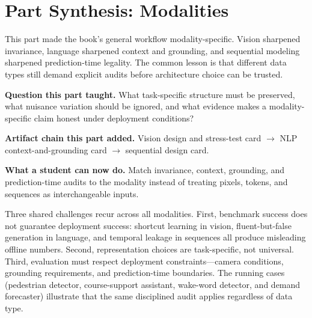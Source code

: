 \chapter*{Part Synthesis: Modalities}

\begin{whychaptermatters}
This part made the book's general workflow modality-specific. Vision sharpened invariance, language sharpened context and grounding, and sequential modeling sharpened prediction-time legality. The common lesson is that different data types still demand explicit audits before architecture choice can be trusted.
\end{whychaptermatters}

\begin{chaptersummary}
\item \textbf{Question this part taught.} What task-specific structure must be preserved, what nuisance variation should be ignored, and what evidence makes a modality-specific claim honest under deployment conditions?
\item \textbf{Artifact chain this part added.} Vision design and stress-test card $\rightarrow$ NLP context-and-grounding card $\rightarrow$ sequential design card.
\item \textbf{What a student can now do.} Match invariance, context, grounding, and prediction-time audits to the modality instead of treating pixels, tokens, and sequences as interchangeable inputs.
\end{chaptersummary}

Three shared challenges recur across all modalities. First, benchmark success does not guarantee deployment success: shortcut learning in vision, fluent-but-false generation in language, and temporal leakage in sequences all produce misleading offline numbers. Second, representation choices are task-specific, not universal. Third, evaluation must respect deployment constraints---camera conditions, grounding requirements, and prediction-time boundaries. The running cases (pedestrian detector, course-support assistant, wake-word detector, and demand forecaster) illustrate that the same disciplined audit applies regardless of data type.

